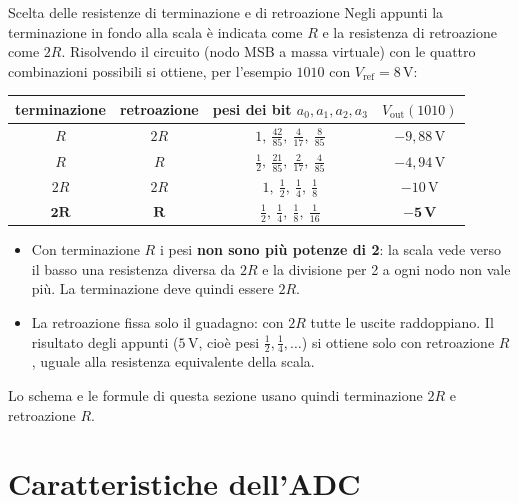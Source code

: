 \begin{osservazione}{Scelta delle resistenze di terminazione e di retroazione}
Negli appunti la terminazione in fondo alla scala è indicata come $R$ e la resistenza di
retroazione come $2R$. Risolvendo il circuito (nodo MSB a massa virtuale) con le quattro
combinazioni possibili si ottiene, per l'esempio $1010$ con $V_{\text{ref}}=8$\,V:
\begin{center}
\small\renewcommand{\arraystretch}{1.6}
\begin{tabular}{c|c|c|c}
\toprule
terminazione & retroazione & pesi dei bit $a_0,a_1,a_2,a_3$ & $V_{\text{out}}(1010)$ \\
\midrule
$R$  & $2R$ & $1,\ \tfrac{42}{85},\ \tfrac{4}{17},\ \tfrac{8}{85}$ & $-9{,}88$\,V \\
$R$  & $R$  & $\tfrac12,\ \tfrac{21}{85},\ \tfrac{2}{17},\ \tfrac{4}{85}$ & $-4{,}94$\,V \\
$2R$ & $2R$ & $1,\ \tfrac12,\ \tfrac14,\ \tfrac18$ & $-10$\,V \\
$\mathbf{2R}$ & $\mathbf{R}$ & $\tfrac12,\ \tfrac14,\ \tfrac18,\ \tfrac1{16}$ & $\mathbf{-5}$\,\textbf{V} \\
\bottomrule
\end{tabular}
\end{center}
\begin{itemize}[leftmargin=1.3em, itemsep=1pt]
    \item Con terminazione $R$ i pesi \textbf{non sono più potenze di 2}: la scala vede
          verso il basso una resistenza diversa da $2R$ e la divisione per 2 a ogni nodo
          non vale più. La terminazione deve quindi essere $2R$.
    \item La retroazione fissa solo il guadagno: con $2R$ tutte le uscite raddoppiano.
          Il risultato degli appunti ($5$\,V, cioè pesi $\tfrac12,\tfrac14,\ldots$) si
          ottiene solo con retroazione $R$, uguale alla resistenza equivalente della scala.
\end{itemize}
Lo schema e le formule di questa sezione usano quindi terminazione $2R$ e retroazione $R$.
\end{osservazione}

\section{Caratteristiche dell'ADC}

